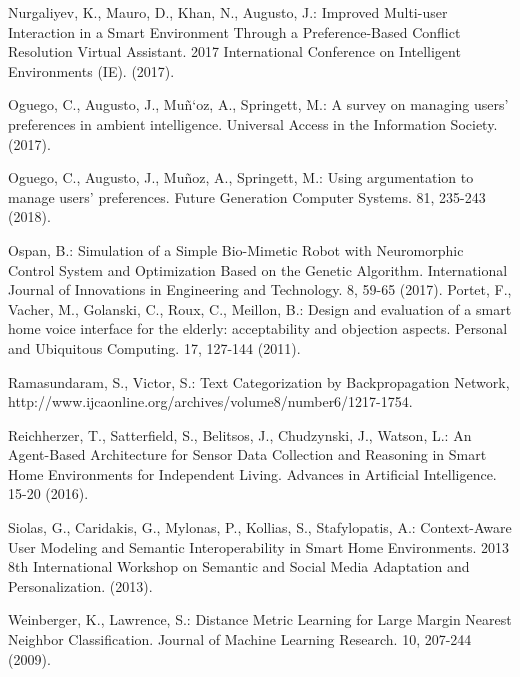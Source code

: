 \documentclass{llncs}
\begin{document}
\begin{thebibliography}{1}
        Nurgaliyev, K., Mauro, D., Khan, N., Augusto, J.: Improved Multi-user Interaction in a Smart Environment Through a Preference-Based Conflict Resolution Virtual Assistant. 2017 International Conference on Intelligent Environments (IE). (2017).

        Oguego, C., Augusto, J., Muñ`oz, A., Springett, M.: A survey on managing users’ preferences in ambient intelligence. Universal Access in the Information Society. (2017).

        Oguego, C., Augusto, J., Muñoz, A., Springett, M.: Using argumentation to manage users’ preferences. Future Generation Computer Systems. 81, 235-243 (2018).

        Ospan, B.: Simulation of a Simple Bio-Mimetic Robot with Neuromorphic Control System and Optimization Based on the Genetic Algorithm. International Journal of Innovations in Engineering and Technology. 8, 59-65 (2017).
        Portet, F., Vacher, M., Golanski, C., Roux, C., Meillon, B.: Design and evaluation of a smart home voice interface for the elderly: acceptability and objection aspects. Personal and Ubiquitous Computing. 17, 127-144 (2011).

        Ramasundaram, S., Victor, S.: Text Categorization by Backpropagation Network, http://www.ijcaonline.org/archives/volume8/number6/1217-1754.

        Reichherzer, T., Satterfield, S., Belitsos, J., Chudzynski, J., Watson, L.: An Agent-Based Architecture for Sensor Data Collection and Reasoning in Smart Home Environments for Independent Living. Advances in Artificial Intelligence. 15-20 (2016).

        Siolas, G., Caridakis, G., Mylonas, P., Kollias, S., Stafylopatis, A.: Context-Aware User Modeling and Semantic Interoperability in Smart Home Environments. 2013 8th International Workshop on Semantic and Social Media Adaptation and Personalization. (2013).

        Weinberger, K., Lawrence, S.: Distance Metric Learning for Large Margin Nearest Neighbor Classification. Journal of Machine Learning Research. 10, 207-244 (2009).

    \end{thebibliography}
\end{document}

